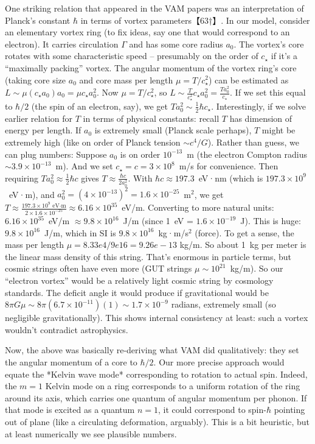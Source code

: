 \documentclass[12pt]{article}
\begin{document}
One striking relation that appeared in the VAM papers was an interpretation of Planck’s constant $\hbar$ in terms of vortex parameters【63†】. In our model, consider an elementary vortex ring (to fix ideas, say one that would correspond to an electron). It carries circulation $\Gamma$ and has some core radius $a_0$. The vortex’s core rotates with some characteristic speed – presumably on the order of $c_\star$ if it’s a “maximally packing” vortex. The angular momentum of the vortex ring’s core (taking core size $a_0$ and core mass per length $\mu = T/c_\star^2$) can be estimated as $L \sim \mu (c_\star a_0) a_0 = \mu c_\star a_0^2$. Now $\mu = T/c_\star^2$, so $L \sim \frac{T}{c_\star^2} c_\star a_0^2 = \frac{T a_0^2}{c_\star}$. If we set this equal to $\hbar/2$ (the spin of an electron, say), we get $T a_0^2 \sim \frac{1}{2} \hbar c_\star$. Interestingly, if we solve earlier relation for $T$ in terms of physical constants: recall $T$ has dimension of energy per length. If $a_0$ is extremely small (Planck scale perhaps), $T$ might be extremely high (like on order of Planck tension $\sim c^4/G$). Rather than guess, we can plug numbers: Suppose $a_0$ is on order $10^{-13}$ m (the electron Compton radius $\sim 3.9\times10^{-13}$ m). And we set $c_\star = c = 3\times10^8$ m/s for convenience. Then requiring $T a_0^2 \approx \frac{1}{2}\hbar c$ gives $T \approx \frac{\hbar c}{2 a_0^2}$. With $\hbar c \approx 197.3$ eV·nm (which is $197.3 \times 10^9$ eV·m), and $a_0^2 = (4\times10^{-13})^2 = 1.6\times10^{-25}$ m$^2$, we get $T \approx \frac{197.3\times10^9 \text{ eV·m}}{2 \times 1.6\times10^{-25}} \approx 6.16\times10^{35}$ eV/m. Converting to more natural units: $6.16\times10^{35}$ eV/m $\approx 9.8\times10^{16}$ J/m (since 1 eV = $1.6\times10^{-19}$ J). This is huge: $9.8\times10^{16}$ J/m, which in SI is $9.8\times10^{16}$ kg·m/s$^2$ (force). To get a sense, the mass per length $\mu = 8.33e4/9e16 = 9.26e-13$ kg/m. So about 1 kg per meter is the linear mass density of this string. That’s enormous in particle terms, but cosmic strings often have even more (GUT strings $\mu \sim 10^{21}$ kg/m). So our “electron vortex” would be a relatively light cosmic string by cosmology standards. The deficit angle it would produce if gravitational would be $8\pi G \mu \sim 8\pi(6.7\times10^{-11})(1) \sim 1.7\times10^{-9}$ radians, extremely small (so negligible gravitationally). This shows internal consistency at least: such a vortex wouldn’t contradict astrophysics.

Now, the above was basically re-deriving what VAM did qualitatively: they set the angular momentum of a core to $\hbar/2$. Our more precise approach would equate the *Kelvin wave mode* corresponding to rotation to actual spin. Indeed, the $m=1$ Kelvin mode on a ring corresponds to a uniform rotation of the ring around its axis, which carries one quantum of angular momentum per phonon. If that mode is excited as a quantum $n=1$, it could correspond to spin-$\hbar$ pointing out of plane (like a circulating deformation, arguably). This is a bit heuristic, but at least numerically we see plausible numbers. 
\end{document}
